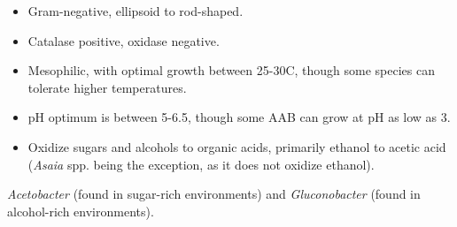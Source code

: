 \begin{itemize}
    \item Gram-negative, ellipsoid to rod-shaped.
    \item Catalase positive, oxidase negative.
    \item Mesophilic, with optimal growth between 25-30\textdegree C, though some species can tolerate higher temperatures.
    \item pH optimum is between 5-6.5, though some AAB can grow at pH as low as 3.
    \item Oxidize sugars and alcohols to organic acids, primarily ethanol to acetic acid (\textit{Asaia} spp. being the exception, as it does not oxidize ethanol).
\end{itemize}

\textit{Acetobacter} (found in sugar-rich environments) and \textit{Gluconobacter} (found in alcohol-rich environments).

